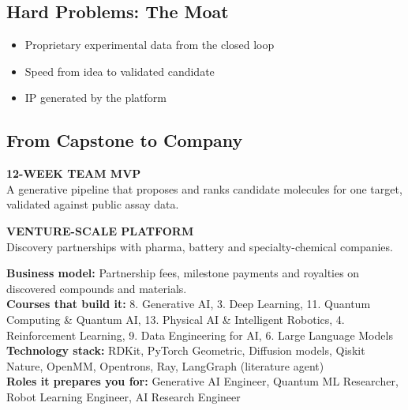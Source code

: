 \documentclass[10pt,a4paper]{article}
\begin{document}
\subsection*{Hard Problems: The Moat}\begin{itemize}\small
\item Proprietary experimental data from the closed loop
\item Speed from idea to validated candidate
\item IP generated by the platform
\end{itemize}
\subsection*{From Capstone to Company}
\begin{tcbraster}[raster columns=2,raster equal height,raster column skip=8pt]\begin{tcolorbox}[colback=l1bg,colframe=l1bg,arc=2pt,borderline north={2.5pt}{0pt}{saffron}]{\scriptsize\bfseries\color{muted}12-WEEK TEAM MVP}\\\small A generative pipeline that proposes and ranks candidate molecules for one target, validated against public assay data.\end{tcolorbox}\begin{tcolorbox}[colback=l3bg,colframe=l3bg,arc=2pt,borderline north={2.5pt}{0pt}{igreen}]{\scriptsize\bfseries\color{muted}VENTURE-SCALE PLATFORM}\\\small Discovery partnerships with pharma, battery and specialty-chemical companies.\end{tcolorbox}\end{tcbraster}
{\small\textbf{Business model:} Partnership fees, milestone payments and royalties on discovered compounds and materials.\\\textbf{Courses that build it:} 8. Generative AI, 3. Deep Learning, 11. Quantum Computing \& Quantum AI, 13. Physical AI \& Intelligent Robotics, 4. Reinforcement Learning, 9. Data Engineering for AI, 6. Large Language Models\\\textbf{Technology stack:} RDKit, PyTorch Geometric, Diffusion models, Qiskit Nature, OpenMM, Opentrons, Ray, LangGraph (literature agent)\\\textbf{Roles it prepares you for:} Generative AI Engineer, Quantum ML Researcher, Robot Learning Engineer, AI Research Engineer}
\end{document}

